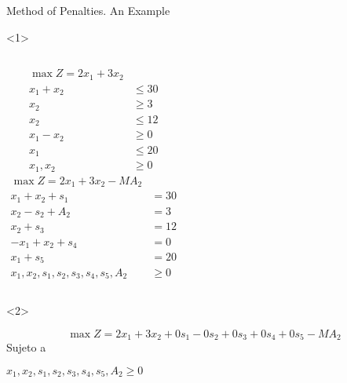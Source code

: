 \begin{frame}{Method of Penalties. An Example}{}

  \begin{onlyenv}<1>
    \begin{columns}
      \begin{align*}
        \max Z = 2x_1 + 3x_2 & \\[5mm]
        x_1 + x_2 & \leq 30\\
        x_2 & \geq 3\\
        x_2 & \leq 12\\
        x_1 - x_2 & \geq 0\\
        x_1  & \leq 20 \\[5mm]
        x_1, x_2 & \geq 0
      \end{align*}
      \begin{align*}
        \max Z = 2x_1 + 3x_2 - MA_2& \\[5mm]
        x_1 + x_2 + s_1  & = 30\\
        x_2  - s_2  + A_2 &= 3\\
        x_2  + s_3 &= 12\\
        -x_1 + x_2 + s_4 & =  0\\
        x_1  + s_5& = 20 \\[5mm]
        x_1, x_2, s_1, s_2, s_3, s_4, s_5, A_2 & \geq 0
      \end{align*}
    \end{columns}
  \end{onlyenv}

  \begin{onlyenv}<2>

    \[ \max Z = 2x_1 + 3x_2 +0s_1 - 0s_2 + 0s_3 + 0s_4 + 0s_5 - MA_2 \]
    Sujeto a 

    $x_1, x_2, s_1, s_2, s_3, s_4, s_5, A_2  \geq 0$
  \end{onlyenv}
\end{frame}

